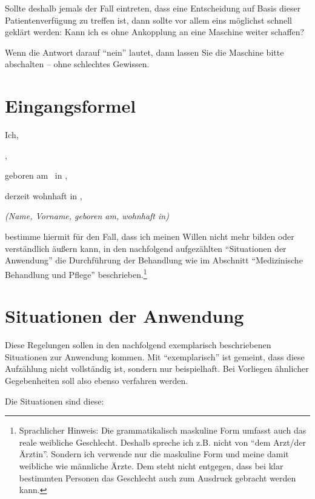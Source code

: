 \documentclass[pdftex,12pt,a4paper]{article}
\begin{document}
Sollte deshalb jemals der Fall eintreten, dass eine Entscheidung 
auf Basis dieser Patientenverfügung zu treffen ist, dann
sollte vor allem eins möglichst schnell geklärt werden:
Kann ich es ohne Ankopplung an eine Maschine weiter schaffen?

Wenn die Antwort darauf \enquote{nein} lautet, dann lassen 
Sie die Maschine bitte abschalten -- ohne schlechtes Gewissen.





\newpage


\section{Eingangsformel}


Ich, 

\myfullname,

geboren am \mybirthday\ in \myplaceofbirth,  

derzeit wohnhaft in \myaddress, 
 
\textit{(Name, Vorname, geboren am, wohnhaft in)}

bestimme hiermit für den Fall, dass ich meinen Willen nicht mehr bilden oder verständlich äußern kann, in den nachfolgend aufgezählten \enquote{Situationen der Anwendung} die Durchführung 
der Behandlung wie im Abschnitt \enquote{Medizinische Behandlung
und Pflege} beschrieben.\footnote{Sprachlicher Hinweis: Die grammatikalisch maskuline Form
umfasst auch das reale weibliche Geschlecht. Deshalb spreche ich z.B. nicht
von \enquote{dem Arzt/der Ärztin}. Sondern ich verwende nur die
maskuline Form und meine damit weibliche wie männliche Ärzte. Dem steht nicht entgegen, dass bei klar bestimmten Personen das Geschlecht auch zum 
Ausdruck gebracht werden kann.}


\section{Situationen der Anwendung}


Diese Regelungen sollen in den nachfolgend exemplarisch beschriebenen Situationen zur Anwendung kommen. Mit \enquote{exemplarisch} ist gemeint, dass diese Aufzählung nicht vollständig ist, sondern nur beispielhaft. Bei Vorliegen ähnlicher Gegebenheiten soll also ebenso verfahren werden.

Die Situationen sind diese:
\end{document}
